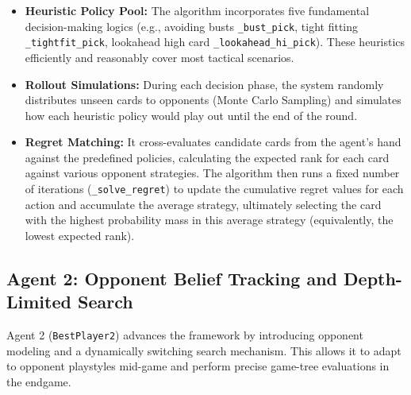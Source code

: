 \documentclass{article}
\begin{document}
\begin{itemize}
    \item \textbf{Heuristic Policy Pool:} The algorithm incorporates five fundamental decision-making logics (e.g., avoiding busts \texttt{\_bust\_pick}, tight fitting \texttt{\_tightfit\_pick}, lookahead high card \texttt{\_lookahead\_hi\_pick}). These heuristics efficiently and reasonably cover most tactical scenarios.
    \item \textbf{Rollout Simulations:} During each decision phase, the system randomly distributes unseen cards to opponents (Monte Carlo Sampling) and simulates how each heuristic policy would play out until the end of the round.
        \item \textbf{Regret Matching:} It cross-evaluates candidate cards from the agent's hand against the predefined policies, calculating the expected rank for each card against various opponent strategies. The algorithm then runs a fixed number of iterations (\texttt{\_solve\_regret}) to update the cumulative regret values for each action and accumulate the average strategy, ultimately selecting the card with the highest probability mass in this average strategy (equivalently, the lowest expected rank).

\end{itemize}

\subsection*{Agent 2: Opponent Belief Tracking and Depth-Limited Search}
Agent 2 (\texttt{BestPlayer2}) advances the framework by introducing opponent modeling and a dynamically switching search mechanism. This allows it to adapt to opponent playstyles mid-game and perform precise game-tree evaluations in the endgame.
\end{document}
